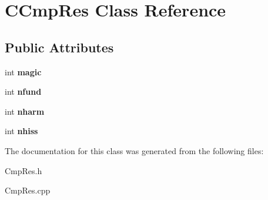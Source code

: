 \hypertarget{class_c_cmp_res}{\section{C\-Cmp\-Res Class Reference}
\label{class_c_cmp_res}
}
\subsection*{Public Attributes}
\begin{DoxyCompactItemize}
\item 
\hypertarget{class_c_cmp_res_afb9697a1e6ed3973085a25e1dcb55fe1}{int {\bfseries magic}}\label{class_c_cmp_res_afb9697a1e6ed3973085a25e1dcb55fe1}

\item 
\hypertarget{class_c_cmp_res_aa33ebddd415b9e5f338d4cab29f42865}{int {\bfseries nfund}}\label{class_c_cmp_res_aa33ebddd415b9e5f338d4cab29f42865}

\item 
\hypertarget{class_c_cmp_res_a2256ac57adc599037cd8831a0ca4751d}{int {\bfseries nharm}}\label{class_c_cmp_res_a2256ac57adc599037cd8831a0ca4751d}

\item 
\hypertarget{class_c_cmp_res_a6ff9fdeea59e9f05b3e8b50acdbffbeb}{int {\bfseries nhiss}}\label{class_c_cmp_res_a6ff9fdeea59e9f05b3e8b50acdbffbeb}

\end{DoxyCompactItemize}


The documentation for this class was generated from the following files\-:\begin{DoxyCompactItemize}
\item 
Cmp\-Res.\-h\item 
Cmp\-Res.\-cpp\end{DoxyCompactItemize}
